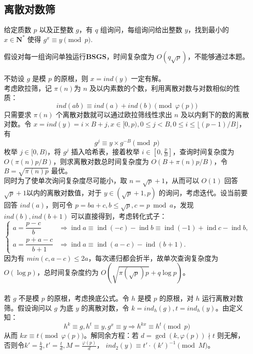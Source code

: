 \documentclass[12pt,a4paper]{article}
\begin{document}
\subsection{离散对数筛}
\begin{mdframed}[leftline=true, linewidth=2pt, linecolor=gray]
	给定质数 $p$ 以及正整数 $g$，有 $q$ 组询问，每组询问给出整数 $y$，找到最小的 $x\in\mathbf{N^*}$ 使得 $g^x\equiv y\pmod p$.
\end{mdframed}
假设对每一组询问单独运行\textbf{BSGS}，时间复杂度为 $O(q\sqrt{p})$，不能够通过本题。\\
\\
不妨设 $g$ 是模 $p$ 的原根，则 $x=ind(y)$ 一定有解。\\
考虑欧拉筛，记 $\pi(n)$为 $n$ 及以内素数的个数，利用离散对数与对数相似的性质：
\begin{equation*}
	ind(ab)\equiv ind(a)+ind(b)\pmod{\varphi(p)}
\end{equation*}
只需要求 $\pi(n)$ 个离散对数就可以通过欧拉筛线性求出 $n$ 及以内剩下的数的离散对数。令 $x=ind(y)=i\times B+j,x\in[0,p),0\le j< B,0\le i\le\lfloor(p-1)/B\rfloor$，有
\begin{equation*}
	g^j\equiv y\times g^{-B}\pmod p
\end{equation*}
枚举 $j\in[0,B)$，将 $g^j$ 插入哈希表，接着枚举 $\displaystyle i\in[0,\frac{p}{B}]$，查询时间复杂度为 $O(\pi(n)p/B)$，则求离散对数总时间复杂度为 $O(B+\pi(n)p/B)$，令 $B=\sqrt{\pi(n)p}$ 最优。\\
同时为了使单次询问复杂度尽可能小，取 $n=\sqrt{p}+1$，从而可以 $O(1)$ 回答 $\sqrt{p}+1$以内的离散对数值，对于 $y\in(\sqrt{p}+1,p)$ 的询问，考虑迭代。设当前要回答 $ind(a)$，则可令 $p=ba+c,b\le\sqrt{p},c=p\bmod a$，发现 $ind(b),ind(b+1)$ 可以直接得到，考虑转化式子：
\[\begin{cases}
	a=\dfrac{p-c}{b} 
	&\Rightarrow \operatorname{ind} a \equiv \operatorname{ind}(-c)-\operatorname{ind} b 
	\equiv \operatorname{ind}(-1)+\operatorname{ind} c-\operatorname{ind} b, \\[6pt]
	a=\dfrac{p+a-c}{b+1} 
	&\Rightarrow \operatorname{ind} a \equiv \operatorname{ind}(a-c)-\operatorname{ind}(b+1).
\end{cases}\]
因为有 $min(c,a−c)\le2a$，每次递归都会折半，故单次查询复杂度为 $O(\log p)$，总时间复杂度约为 $O(\sqrt{\pi(\sqrt{p})p}+q\log{p})$。\\
\\
若 $g$ 不是模 $p$ 的原根，考虑换底公式。令 $h$ 是模 $p$ 的原根，对 $h$ 运行离散对数筛。假设询问以 $g$ 为底 $y$ 的离散对数，令 $k=ind_h(g),t=ind_h(y)$。由定义知：
\begin{equation*}
	h^k\equiv g,h^t\equiv y,g^x\equiv y\Rightarrow h^{kx}\equiv h^t\pmod{p}
\end{equation*}
从而 $kx\equiv t\pmod{\varphi(p)}$。解同余方程：若 $d=\gcd(k,\varphi(p))\nmid t$ 则无解，否则令$\displaystyle k'=\frac{k}{d},t'=\frac{t}{d},M=\frac{\varphi(p)}{d}$， $ind_2(y)\equiv t'\cdot (k')^{-1}\pmod M$。
\end{document}
